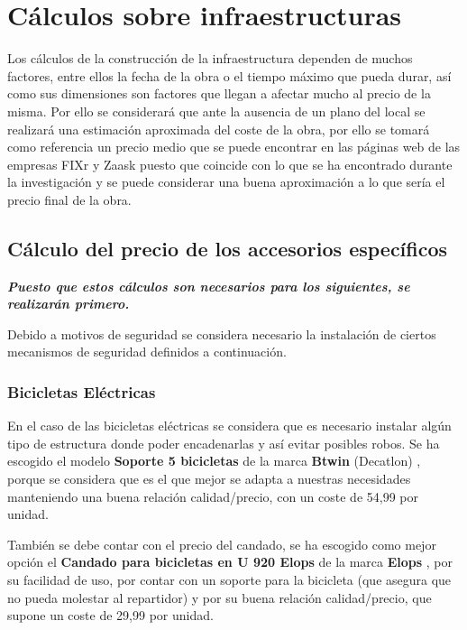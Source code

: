 \newpage
\section{Cálculos sobre infraestructuras}
\label{anexo:infraestructuras}

Los cálculos de la construcción de la infraestructura dependen de muchos factores, entre ellos la fecha de la obra o el tiempo máximo que pueda durar, así como sus dimensiones son factores que llegan a afectar mucho al precio de la misma. Por ello se considerará que ante la ausencia de un plano del local se realizará una estimación aproximada del coste de la obra, por ello se tomará como referencia un precio medio que se puede encontrar en las páginas web de las empresas FIXr \cite{fixr} y Zaask \cite{zaask} puesto que coincide con lo que se ha encontrado durante la investigación y se puede considerar una buena aproximación a lo que sería el precio final de la obra.

\subsection{Cálculo del precio de los accesorios específicos}

\textbf{\textit{Puesto que estos cálculos son necesarios para los siguientes, se realizarán primero.}}

Debido a motivos de seguridad se considera necesario la instalación de ciertos mecanismos de seguridad definidos a continuación.

\subsubsection{Bicicletas Eléctricas}
En el caso de las bicicletas eléctricas se considera que es necesario instalar algún tipo de estructura donde poder encadenarlas y así evitar posibles robos. Se ha escogido el modelo \textbf{Soporte 5 bicicletas} de la marca \textbf{Btwin} (Decatlon) \cite{decathlons5b}, porque se considera que es el que mejor se adapta a nuestras necesidades manteniendo una buena relación calidad/precio, con un coste de 54,99  por unidad.

También se debe contar con el precio del candado, se ha escogido como mejor opción el \textbf{Candado para bicicletas en U 920 Elops} de la marca \textbf{Elops} \cite{decathloncb}, por su facilidad de uso, por contar con un soporte para la bicicleta (que asegura que no pueda molestar al repartidor) y por su buena relación calidad/precio, que supone un coste de 29,99  por unidad.

